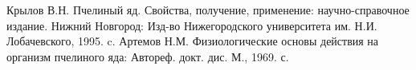 
\begin{thebibliography}{99}
   	Крылов В.Н. Пчелиный яд. Свойства, получение, применение: научно-справочное издание. Нижний Новгород: Изд-во Нижегородского университета им. Н.И. Лобачевского, 1995.  c.
   	Артемов Н.М. Физиологические основы действия на организм пчелиного яда: Автореф. докт. дис. М., 1969.  с.
\end{thebibliography}

